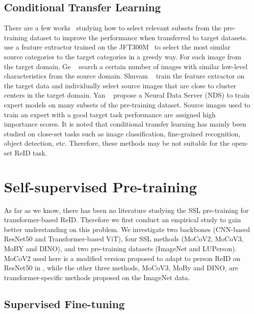 \documentclass[10pt,twocolumn,letterpaper]{article}
\begin{document}
\subsection{Conditional Transfer Learning}

There are a few works~\cite{chakraborty2020efficient, coleman2020selection, ge2017borrowing, cui2018large, Fine, yan2020neural} studying how to select relevant subsets from the pre-training dataset to improve the performance when transferred to target datasets. \cite{cui2018large} use a feature extractor trained on the JFT300M~\cite{hinton2015distilling} to select the most similar source categories to the target categories in a greedy way. For each image from the target domain, Ge \etal~\cite{ge2017borrowing} search a certain number of images with similar low-level characteristics from the source domain. Shuvam \etal~\cite{chakraborty2020efficient} train the feature extractor on the target data and individually select source images that are close to cluster centers in the target domain. Yan \etal~\cite{yan2020neural} propose a Neural Data Server (NDS) to train expert models on many subsets of the pre-training dataset. Source images used to train an expert with a good target task performance are assigned high importance scores. It is noted that conditional transfer learning has mainly been studied on close-set tasks such as image classification, fine-grained recognition, object detection, etc. Therefore, these methods may be not suitable for the open-set ReID task.

\section{Self-supervised Pre-training}

As far as we know, there has been no literature studying the SSL pre-training for transformer-based ReID. Therefore we first conduct an empirical study to gain better understanding on this problem. We investigate two backbones (CNN-based ResNet50 and Transformer-based ViT), four SSL methods (MoCoV2, MoCoV3, MoBY and DINO), and two pre-training datasets (ImageNet and LUPerson). MoCoV2 used here is a modified version proposed to adapt to person ReID on ResNet50 in \cite{fu2021unsupervised}, while the other three methods, \ie MoCoV3, MoBy and DINO, are transformer-specific methods proposed on the ImageNet data. 

\subsection{Supervised Fine-tuning}
\end{document}
